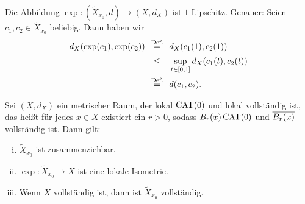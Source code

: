 \begin{bemerkung}
\label{bem:2.30}
	Die Abbildung $\exp\colon (\tilde{X}_{x_0},d) \rightarrow  (X,d_X)$ ist $1$-Lipschitz.
	Genauer:
	Seien $c_1,c_2 \in \tilde{X}_{x_0}$ beliebig.
	Dann haben wir
	\begin{align*}
		d_X(\exp(c_1),\exp(c_2)) &\stack{\text{Def.}}{=} d_X(c_1(1),c_2(1)) \\
		&\stack{}{\leq} \sup_{t \in [0,1]} d_X(c_1(t),c_2(t)) \\
		&\stack{\text{Def.}}{=} d(c_1,c_2).
	\end{align*}
\end{bemerkung}

\begin{satz}
\label{satz:2.31}
	Sei $(X,d_X)$ ein metrischer Raum, der lokal $\operatorname{CAT(0)}$ und lokal vollständig ist, das heißt für jedes $x \in X$ existiert ein $r > 0$, sodass $B_r(x) \operatorname{CAT(0)}$ und $\overline{B_r(x)}$ vollständig ist.
	Dann gilt:
	\begin{enumerate}[(i)]
		\item $\tilde{X}_{x_0}$ ist zusammenziehbar.
		\item $\exp\colon \tilde{X}_{x_0} \rightarrow X$ ist eine lokale Isometrie.
		\item Wenn $X$ vollständig ist, dann ist $\tilde{X}_{x_0}$ vollständig.
	\end{enumerate}
\end{satz}

